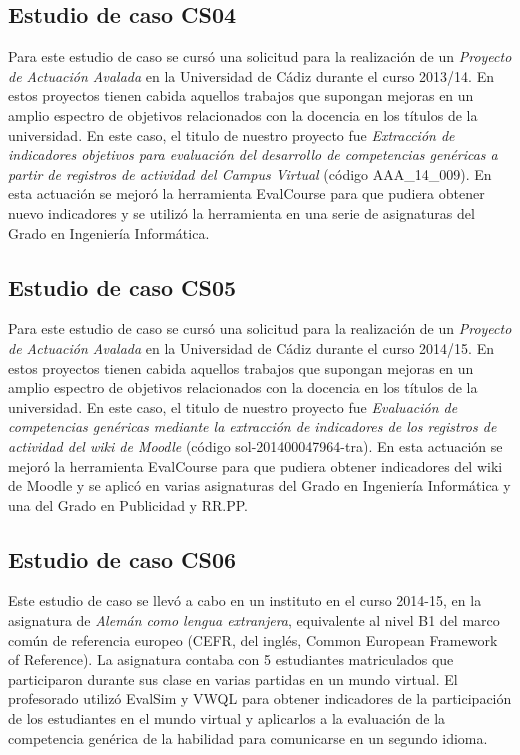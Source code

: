 	\subsection{Estudio de caso CS04} \label{AA1}

		Para este estudio de caso se cursó una solicitud para la realización de un \emph{Proyecto de Actuación Avalada} en la Universidad de Cádiz durante el curso 2013/14. En estos proyectos tienen cabida aquellos trabajos que supongan mejoras en un amplio espectro de objetivos relacionados con la docencia en los títulos de la universidad. En este caso, el titulo de nuestro proyecto fue \emph{Extracción de indicadores objetivos para evaluación del desarrollo de competencias genéricas a partir de registros de actividad del Campus Virtual} (código AAA\_14\_009). En esta actuación se mejoró la herramienta EvalCourse para que pudiera obtener nuevo indicadores y se utilizó la herramienta en una serie de asignaturas del Grado en Ingeniería Informática. 

	\subsection{Estudio de caso CS05} \label{AA2}

		Para este estudio de caso se cursó una solicitud para la realización de un \emph{Proyecto de Actuación Avalada} en la Universidad de Cádiz durante el curso 2014/15. En estos proyectos tienen cabida aquellos trabajos que supongan mejoras en un amplio espectro de objetivos relacionados con la docencia en los títulos de la universidad. En este caso, el titulo de nuestro proyecto fue \emph{Evaluación de competencias genéricas mediante la extracción de indicadores de los registros de actividad del wiki de Moodle} (código sol-201400047964-tra). En esta actuación se mejoró la herramienta EvalCourse para que pudiera obtener indicadores del wiki de Moodle y se aplicó en varias asignaturas del Grado en Ingeniería Informática y una del Grado en Publicidad y RR.PP. 

	\subsection{Estudio de caso CS06}

		Este estudio de caso se llevó a cabo en un instituto en el curso 2014-15, en la asignatura de \emph{Alemán como lengua extranjera}, equivalente al nivel B1 del marco común de referencia europeo (CEFR, del inglés, Common European Framework of Reference). La asignatura contaba con 5 estudiantes matriculados que participaron durante sus clase en varias partidas en un mundo virtual. El profesorado utilizó EvalSim y VWQL para obtener indicadores de la participación de los estudiantes en el mundo virtual y aplicarlos a la evaluación de la competencia genérica de la habilidad para comunicarse en un segundo idioma.

